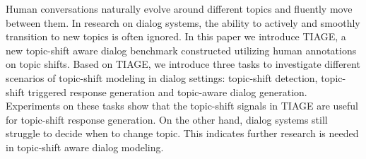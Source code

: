 Human conversations naturally evolve around different topics and fluently move between them. In research on dialog systems, the ability to actively and smoothly transition to new topics is often ignored. In this paper we introduce TIAGE, a new topic-shift aware dialog benchmark constructed utilizing human annotations on topic shifts. Based on TIAGE, we introduce three tasks to investigate different scenarios of topic-shift modeling in dialog settings: topic-shift detection, topic-shift triggered response generation and topic-aware dialog generation. Experiments on these tasks show that the topic-shift signals in TIAGE are useful for topic-shift response generation. On the other hand, dialog systems still struggle to decide when to change topic. This indicates further research is needed in topic-shift aware dialog modeling.
